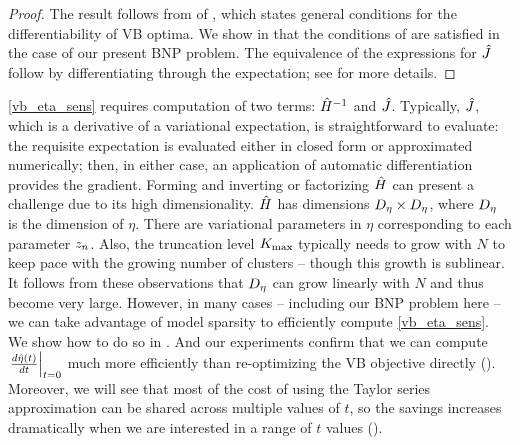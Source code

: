 %
\begin{proof}
%
The result follows from  of ,
which states general conditions for the differentiability of VB optima.  We show
in  that the conditions
of  are satisfied in the case of our present BNP problem. The
equivalence of the expressions for $\hat J$ follow by differentiating
through the expectation; see  for more details.
%
\end{proof}
%

\eqref{vb_eta_sens} requires computation of two terms: $\hat{H}^{-1}$ and
$\hat J$.  Typically, $\hat J$, which is a derivative of a
variational expectation, is straightforward to evaluate: the requisite
expectation is evaluated either in closed form or approximated numerically;
then, in either case, an application of automatic differentiation provides the
gradient. Forming and inverting or factorizing $\hat{H}$ can present a
challenge due to its high dimensionality. $\hat{H}$ has dimensions ${D_{\eta}}
\times {D_{\eta}}$, where ${D_{\eta}}$ is the dimension of $\eta$. There are
variational parameters in $\eta$ corresponding to each parameter $z_n$. Also,
the truncation level ${K_{\mathrm{max}}}$ typically needs to grow with $N$ to keep pace with
the growing number of clusters -- though this growth is sublinear. It follows
from these observations that ${D_{\eta}}$ can grow linearly with $N$ and thus
become very large.  However, in many cases -- including our BNP problem here --
we can take advantage of model sparsity to efficiently compute
\eqref{vb_eta_sens}. We show how to do so in . And
our experiments confirm that we can compute $\left.\frac{d \hat\eta(t)}{d t}\right\vert_{t=0}$
much more efficiently than re-optimizing the VB objective directly
(). Moreover, we will see that most of the cost of using
the Taylor series approximation can be shared across multiple values of $t$, so
the savings increases dramatically when we are interested in a range of $t$
values ().

